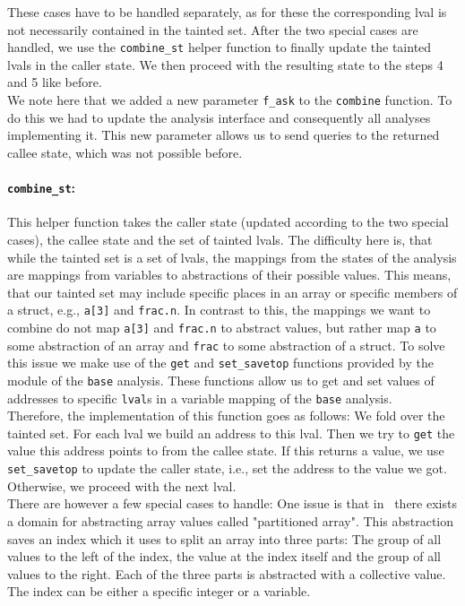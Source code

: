     These cases have to be handled separately, as for these the corresponding \ac{lval} is not necessarily contained in the tainted set. After the two special cases are handled, we use the \texttt{combine\_st} helper function to finally update the tainted \ac{lval}s in the caller state. We then proceed with the resulting state to the steps 4 and 5 like before.\\
    We note here that we added a new parameter \texttt{f\_ask} to the \texttt{combine} function. To do this we had to update the analysis interface and consequently all analyses implementing it. This new parameter allows us to send queries to the returned callee state, which was not possible before.
    \paragraph{\texttt{combine\_st}:} This helper function takes the caller state (updated according to the two special cases), the callee state and the set of tainted \ac{lval}s. The difficulty here is, that while the tainted set is a set of \ac{lval}s, the mappings from the states of the  analysis are mappings from variables to abstractions of their possible values. This means, that our tainted set may include specific places in an array or specific members of a struct, e.g., \texttt{a[3]} and \texttt{frac.n}. In contrast to this, the mappings we want to combine do not map \texttt{a[3]} and \texttt{frac.n} to abstract values, but rather map \texttt{a} to some abstraction of an array and \texttt{frac} to some abstraction of a struct. To solve this issue we make use of the \texttt{get} and \texttt{set\_savetop} functions provided by the module of the \texttt{base} analysis. These functions allow us to get and set values of addresses to specific \texttt{lval}s in a variable mapping of the \texttt{base} analysis.\\
    Therefore, the implementation of this function goes as follows: We fold over the tainted set. For each \ac{lval} we build an address to this \ac{lval}. Then we try to \texttt{get} the value this address points to from the callee state. If this returns a value, we use \texttt{set\_savetop} to update the caller state, i.e., set the address to the value we got. Otherwise, we proceed with the next \ac{lval}.\\
    There are however a few special cases to handle: One issue is that in \gob\ there exists a domain for abstracting array values called "partitioned array". This abstraction saves an index which it uses to split an array into three parts: The group of all values to the left of the index, the value at the index itself and the group of all values to the right. Each of the three parts is abstracted with a collective value. The index can be either a specific integer or a variable.\\
